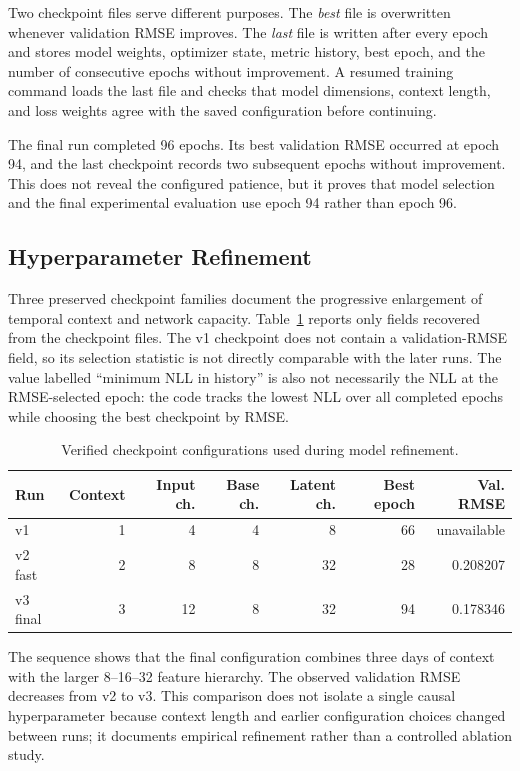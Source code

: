 Two checkpoint files serve different purposes. The \emph{best} file is overwritten whenever validation RMSE improves. The \emph{last} file is written after every epoch and stores model weights, optimizer state, metric history, best epoch, and the number of consecutive epochs without improvement. A resumed training command loads the last file and checks that model dimensions, context length, and loss weights agree with the saved configuration before continuing.

The final run completed 96 epochs. Its best validation RMSE occurred at epoch 94, and the last checkpoint records two subsequent epochs without improvement. This does not reveal the configured patience, but it proves that model selection and the final experimental evaluation use epoch 94 rather than epoch 96.

\subsection{Hyperparameter Refinement}

Three preserved checkpoint families document the progressive enlargement of temporal context and network capacity. Table~\ref{tab:checkpoint-comparison} reports only fields recovered from the checkpoint files. The v1 checkpoint does not contain a validation-RMSE field, so its selection statistic is not directly comparable with the later runs. The value labelled ``minimum NLL in history'' is also not necessarily the NLL at the RMSE-selected epoch: the code tracks the lowest NLL over all completed epochs while choosing the best checkpoint by RMSE.

\begin{table}[htbp]
\centering
\small
\caption{Verified checkpoint configurations used during model refinement.}
\label{tab:checkpoint-comparison}
\begin{tabular}{lrrrrrr}
\toprule
Run & Context & Input ch. & Base ch. & Latent ch. & Best epoch & Val. RMSE \\
\midrule
v1 & 1 & 4 & 4 & 8 & 66 & unavailable \\
v2 fast & 2 & 8 & 8 & 32 & 28 & 0.208207 \\
v3 final & 3 & 12 & 8 & 32 & 94 & 0.178346 \\
\bottomrule
\end{tabular}
\end{table}

The sequence shows that the final configuration combines three days of context with the larger 8--16--32 feature hierarchy. The observed validation RMSE decreases from v2 to v3. This comparison does not isolate a single causal hyperparameter because context length and earlier configuration choices changed between runs; it documents empirical refinement rather than a controlled ablation study.

